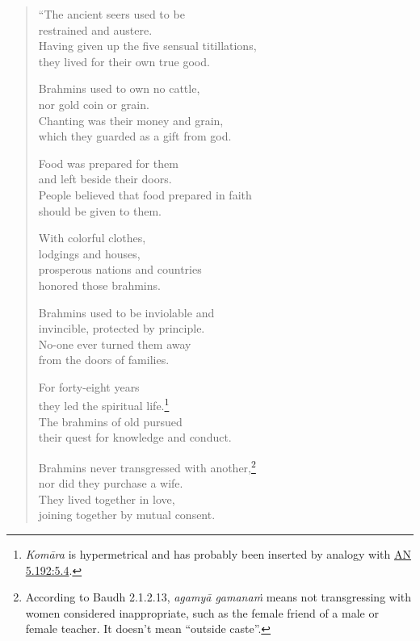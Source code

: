 \documentclass[12pt,openany]{book}%
\begin{document}
\begin{verse}%
“The ancient seers used to be \\
restrained and austere. \\
Having given up the five sensual titillations, \\
they lived for their own true good. 

Brahmins used to own no cattle, \\
nor gold coin or grain. \\
Chanting was their money and grain, \\
which they guarded as a gift from god. 

Food was prepared for them \\
and left beside their doors. \\
People believed that food prepared in faith \\
should be given to them. 

With colorful clothes, \\
lodgings and houses, \\
prosperous nations and countries \\
honored those brahmins. 

Brahmins used to be inviolable and \\
invincible, protected by principle. \\
No-one ever turned them away \\
from the doors of families. 

For forty-eight years \\
they led the spiritual life.\footnote{\textit{\textsanskrit{Komāra}} is hypermetrical and has probably been inserted by analogy with \href{https://suttacentral.net/an5.192/en/sujato\#5.4}{AN 5.192:5.4}. } \\
The brahmins of old pursued \\
their quest for knowledge and conduct. 

Brahmins never transgressed with another,\footnote{According to Baudh 2.1.2.13, \textit{\textsanskrit{agamyā} \textsanskrit{gamanaṁ}} means not transgressing with women considered inappropriate, such as the female friend of a male or female teacher. It doesn’t mean “outside caste”. } \\
nor did they purchase a wife. \\
They lived together in love, \\
joining together by mutual consent. 


\end{verse}
\end{document}
